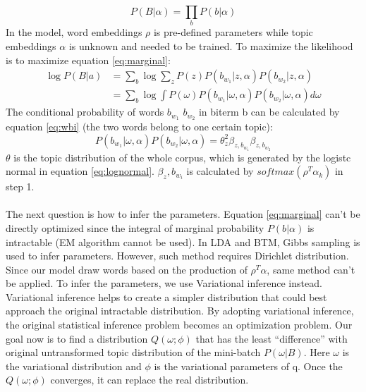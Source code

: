 \begin{equation}
    P(B|\alpha) = \prod_bP(b|\alpha)
    \label{eq:corpus}
\end{equation}
In the model, word embeddings $\rho$ is pre-defined parameters while topic embeddings $\alpha$ is unknown and needed to be trained.
To maximize the likelihood is to maximize equation \ref{eq:marginal}:
\begin{equation}
    \begin{aligned}
        \log P(B|a) & = \sum_{b} \log \sum_zP(z)P(b_{w_1}|z,\alpha)P(b_{w_2}|z,\alpha)\\
        & = \sum_{b}\log \int P(\omega)P(b_{w_1}|\omega,\alpha)P(b_{w_2}|\omega,\alpha)d\omega
    \end{aligned} 
    \label{eq:marginal}
\end{equation}
The conditional probability of words $b_{w_1}$ $b_{w_2}$ in biterm b can be calculated by equation \ref{eq:wbi} (the two words belong to one certain topic):
\begin{equation}
    P(b_{w_1}|\omega,\alpha)P(b_{w_2}|\omega,\alpha) = \theta_z^2\beta_{z,b_{w_1}}\beta_{z,b_{w_2}}
\label{eq:wbi}
\end{equation}
$\theta$ is the topic distribution of the whole corpus, which is generated by the logistc normal in equation \ref{eq:lognormal}. $\beta_z,b_{w_i}$ is calculated by $softmax(\rho^T\alpha_k)$ in step 1.
\\\\
The next question is how to infer the parameters. Equation \ref{eq:marginal} can't be directly optimized since the integral of marginal probability $P(b|\alpha)$ is intractable (EM algorithm cannot be used). In LDA and BTM, Gibbs sampling is used to infer parameters. However, such method requires Dirichlet distribution. Since our model draw words based on the production of $\rho^T\alpha$, same method can't be applied. To infer the parameters, we use Variational inference\cite{wainwright2008graphical} instead. Variational inference helps to create a simpler distribution that could best approach the original intractable distribution. By adopting variational inference, the original statistical inference problem becomes an optimization problem. Our goal now is to find a distribution $Q(\omega; \phi)$ that has the least ``difference'' with original untransformed topic distribution of the mini-batch $P(\omega|B)$. Here $\omega$ is the variational distribution and $\phi$ is the variational parameters of q. Once the $Q(\omega; \phi)$ converges, it can replace the real distribution.
